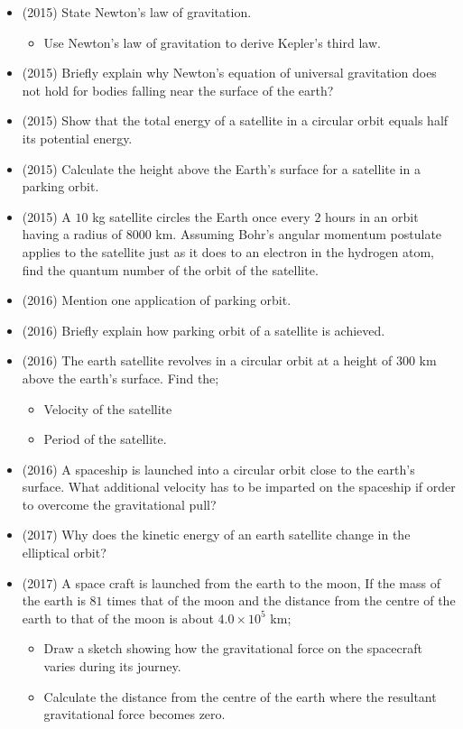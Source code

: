 \documentclass{article}
\begin{document}
\begin{itemize}
\item (2015)  State Newton's law of gravitation. \begin{itemize}
\item Use Newton’s law of gravitation to derive Kepler’s third law.
\end{itemize}
\item (2015)  Briefly explain why Newton’s equation of universal gravitation does not hold for bodies falling near the surface of the earth? 
\item (2015)  Show that the total energy of a satellite in a circular orbit equals half its potential energy.
\item (2015)  Calculate the height above the Earth’s surface for a satellite in a parking orbit.
\item (2015)  A $ 10$ kg satellite circles the Earth once every $ 2$ hours in an orbit having a radius of $ 8000$ km.  Assuming Bohr’s angular momentum postulate applies to the satellite just as it does to an electron in the hydrogen atom,  find the quantum number of the orbit of the satellite.
\item (2016)  Mention one application of parking orbit.
\item (2016)  Briefly explain how parking orbit of a satellite is achieved.
\item (2016)  The earth satellite revolves in a circular orbit at a height of $ 300$ km above the earth’s surface.  Find the; \begin{itemize}
\item Velocity of the satellite
\item Period of the satellite.
\end{itemize}
\item (2016)  A spaceship is launched into a circular orbit close to the earth’s surface.  What additional velocity has to be imparted on the spaceship if order to overcome the gravitational pull?
\item (2017)  Why does the kinetic energy of an earth satellite change in the elliptical orbit?
\item (2017)  A space craft is launched from the earth to the moon, If the mass of the earth is $ 81$ times that of the moon and the distance from the centre of the earth to that of the moon is about $ 4.0 \times 10^{5}$ km;\begin{itemize}
\item Draw a sketch showing how the gravitational force on the spacecraft varies during its journey. 
\item Calculate the distance from the centre of the earth where the resultant gravitational force becomes zero. 

\end{itemize}
\end{itemize}
\end{document}
